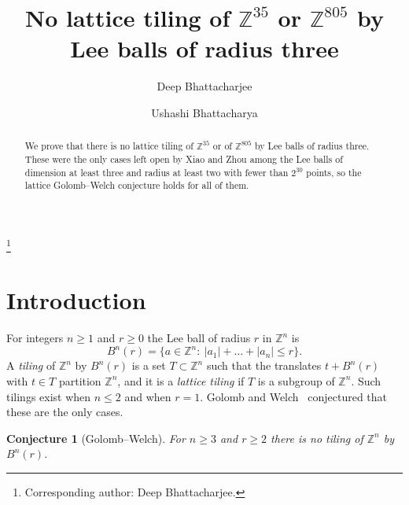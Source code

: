 \documentclass{amsart}
\newtheorem{conjecture}{Conjecture}
\theoremstyle{definition}
\theoremstyle{remark}
\numberwithin{equation}{section}
\newcommand{\Z}{\mathbb{Z}}
\begin{document}
\title[Lattice tilings by Lee balls of radius three]{No lattice tiling of $\mathbb{Z}^{35}$ or $\mathbb{Z}^{805}$ by Lee balls of radius three}

\author[D. Bhattacharjee]{Deep Bhattacharjee}
\address{Formerly, Electro-Gravitational Space Propulsion Laboratory (EGSPL),\newline Bhubaneswar, Odisha 751030, India; Formerly, University of Calcutta, Senate House,/1 College Street, Kolkata 700073, West Bengal, India}
\thanks{Corresponding author: Deep Bhattacharjee.}

\author[U. Bhattacharya]{Ushashi Bhattacharya}
\address{Formerly, National Taiwan University, Taipei 106319, Taiwan}


\begin{abstract}
We prove that there is no lattice tiling of $\mathbb{Z}^{35}$ or of $\mathbb{Z}^{805}$ by Lee balls of radius three. These were the only cases left open by Xiao and Zhou among the Lee balls of dimension at least three and radius at least two with fewer than $2^{30}$ points, so the lattice Golomb--Welch conjecture holds for all of them.
\end{abstract}

\maketitle

\section{Introduction}

For integers $n\ge1$ and $r\ge0$ the Lee ball of radius $r$ in $\Z^n$ is
\[
B^n(r)=\{a\in\Z^n:\ |a_1|+\dots+|a_n|\le r\}.
\]
A \emph{tiling} of $\Z^n$ by $B^n(r)$ is a set $T\subset\Z^n$ such that the translates $t+B^n(r)$ with $t\in T$ partition $\Z^n$, and it is a \emph{lattice tiling} if $T$ is a subgroup of $\Z^n$. Such tilings exist when $n\le2$ and when $r=1$. Golomb and Welch~\cite{GW} conjectured that these are the only cases.

\begin{conjecture}[Golomb--Welch]\label{conj:gw}
For $n\ge3$ and $r\ge2$ there is no tiling of $\Z^n$ by $B^n(r)$.
\end{conjecture}
\end{document}
